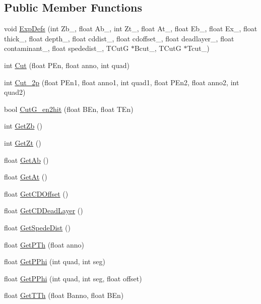 \subsection*{Public Member Functions}
\begin{DoxyCompactItemize}
\item 
void \hyperlink{classdoppler_ac628277148db1641251745f86ba3dc52}{Exp\-Defs} (int Zb\-\_\-, float Ab\-\_\-, int Zt\-\_\-, float At\-\_\-, float Eb\-\_\-, float Ex\-\_\-, float thick\-\_\-, float depth\-\_\-, float cddist\-\_\-, float cdoffset\-\_\-, float deadlayer\-\_\-, float contaminant\-\_\-, float spededist\-\_\-, T\-Cut\-G $\ast$Bcut\-\_\-, T\-Cut\-G $\ast$Tcut\-\_\-)
\item 
int \hyperlink{classdoppler_aa3debb227d73f7cdea5b02e4c202cb19}{Cut} (float P\-En, float anno, int quad)
\item 
int \hyperlink{classdoppler_a52f116733da78465469a75ced66915a8}{Cut\-\_\-2p} (float P\-En1, float anno1, int quad1, float P\-En2, float anno2, int quad2)
\item 
bool \hyperlink{classdoppler_a56df9f9384f469385458193754c743c9}{Cut\-G\-\_\-en2hit} (float B\-En, float T\-En)
\item 
int \hyperlink{classdoppler_a29e9a1565d90df9f5d9deef05cdbf53c}{Get\-Zb} ()
\item 
int \hyperlink{classdoppler_ac0587ca2b963edec86d17dd6dac024ce}{Get\-Zt} ()
\item 
float \hyperlink{classdoppler_a364b85a1e3be8f5386dab5f0b6fe2da3}{Get\-Ab} ()
\item 
float \hyperlink{classdoppler_aef253058a4cae5ab5c6b2662d6afb39d}{Get\-At} ()
\item 
float \hyperlink{classdoppler_ac7725720fab82af5a5a6f02041bc9483}{Get\-C\-D\-Offset} ()
\item 
float \hyperlink{classdoppler_a2c1aef6db4ad3fc0c98e91d995992706}{Get\-C\-D\-Dead\-Layer} ()
\item 
float \hyperlink{classdoppler_ae45abdba9f375009cdeba5ac81d7b32c}{Get\-Spede\-Dist} ()
\item 
float \hyperlink{classdoppler_a1415bdb47dbb9d5eba7f14a64bd3693e}{Get\-P\-Th} (float anno)
\item 
float \hyperlink{classdoppler_a0f57a8f4a8c369c14d52e62dd3833f2e}{Get\-P\-Phi} (int quad, int seg)
\item 
float \hyperlink{classdoppler_ac8f059cc77214a954be534a85c748a3c}{Get\-P\-Phi} (int quad, int seg, float offset)
\item 
float \hyperlink{classdoppler_a7865dcf92a6b18d23cb48e9e624e505b}{Get\-T\-Th} (float Banno, float B\-En)

\end{DoxyCompactItemize}
